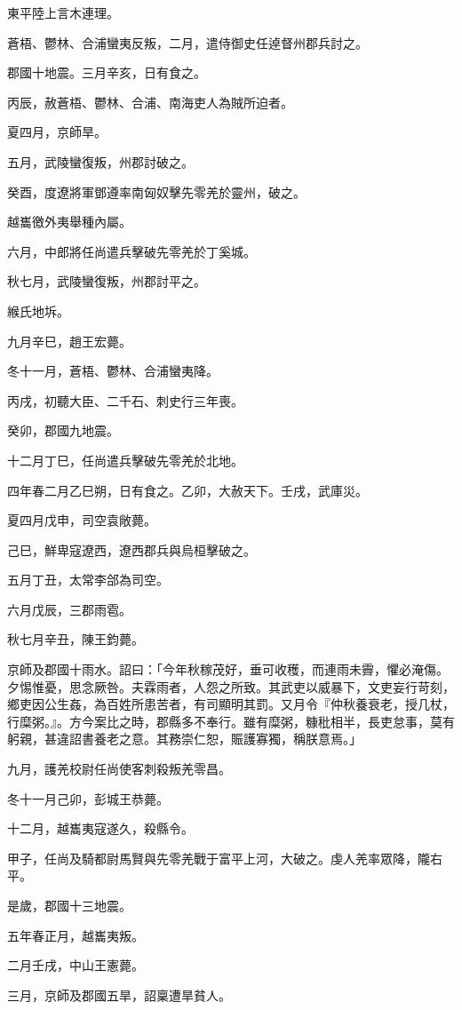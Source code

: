 \begin{pinyinscope}
東平陸上言木連理。

蒼梧、鬱林、合浦蠻夷反叛，二月，遣侍御史任逴督州郡兵討之。

郡國十地震。三月辛亥，日有食之。

丙辰，赦蒼梧、鬱林、合浦、南海吏人為賊所迫者。

夏四月，京師旱。

五月，武陵蠻復叛，州郡討破之。

癸酉，度遼將軍鄧遵率南匈奴擊先零羌於靈州，破之。

越巂徼外夷舉種內屬。

六月，中郎將任尚遣兵擊破先零羌於丁奚城。

秋七月，武陵蠻復叛，州郡討平之。

緱氏地坼。

九月辛巳，趙王宏薨。

冬十一月，蒼梧、鬱林、合浦蠻夷降。

丙戌，初聽大臣、二千石、刺史行三年喪。

癸卯，郡國九地震。

十二月丁巳，任尚遣兵擊破先零羌於北地。

四年春二月乙巳朔，日有食之。乙卯，大赦天下。壬戌，武庫災。

夏四月戊申，司空袁敞薨。

己巳，鮮卑寇遼西，遼西郡兵與烏桓擊破之。

五月丁丑，太常李郃為司空。

六月戊辰，三郡雨雹。

秋七月辛丑，陳王鈞薨。

京師及郡國十雨水。詔曰：「今年秋稼茂好，垂可收穫，而連雨未霽，懼必淹傷。夕惕惟憂，思念厥咎。夫霖雨者，人怨之所致。其武吏以威暴下，文吏妄行苛刻，鄉吏因公生姦，為百姓所患苦者，有司顯明其罰。又月令『仲秋養衰老，授几杖，行糜粥。』。方今案比之時，郡縣多不奉行。雖有糜粥，糠秕相半，長吏怠事，莫有躬親，甚違詔書養老之意。其務崇仁恕，賑護寡獨，稱朕意焉。」

九月，護羌校尉任尚使客刺殺叛羌零昌。

冬十一月己卯，彭城王恭薨。

十二月，越巂夷寇遂久，殺縣令。

甲子，任尚及騎都尉馬賢與先零羌戰于富平上河，大破之。虔人羌率眾降，隴右平。

是歲，郡國十三地震。

五年春正月，越巂夷叛。

二月壬戌，中山王憲薨。

三月，京師及郡國五旱，詔稟遭旱貧人。


\end{pinyinscope}
